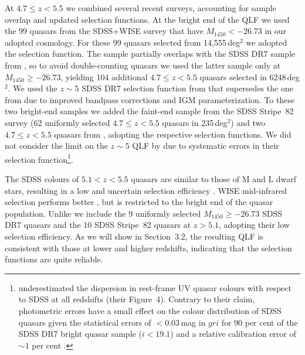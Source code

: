 \documentclass[fleqn,usenatbib]{mnras}
\begin{document}
At $4.7\le z<5.5$ we combined several recent surveys, accounting for
sample overlap and updated selection functions. At the bright end of
the QLF we used the 99 quasars from the SDSS+WISE survey
\citep{2016ApJ...829...33Y} that have $M_{1450}<-26.73$ in our adopted
cosmology.  For these 99 quasars selected from 14,555\,deg$^2$ we
adopted the \citet{2016ApJ...829...33Y} selection function.  The
\citet{2016ApJ...829...33Y} sample partially overlaps with the SDSS
DR7 sample from \citet{2013ApJ...768..105M}, so to avoid
double-counting quasars we used the latter sample only at $M_{1450}\ge
-26.73$, yielding 104 additional $4.7\le z<5.5$ quasars selected in
6248\,deg$^2$. We used the $z\sim 5$ SDSS DR7 selection function from
\citet{2013ApJ...768..105M} that supersedes the one from
\citet{2006AJ....131.2766R} due to improved bandpass corrections and IGM
parameterization.  To these two bright-end samples we added the
faint-end sample from the \citet{2013ApJ...768..105M} SDSS Stripe~82
survey (62 uniformly selected $4.7\le z<5.5$ quasars in 235\,deg$^2$)
and two $4.7\le z<5.5$ quasars from \citet{2011ApJ...728L..26G},
adopting the respective selection functions.  We did not consider the
limit on the $z\sim 5$ QLF by \citet{2012ApJ...756..160I} due to
systematic errors in their selection
function\footnote{\citet{2012ApJ...756..160I} underestimated the
  dispersion in rest-frame UV quasar colours with respect to SDSS at
  all redshifts (their Figure~4). Contrary to their claim, photometric
  errors have a small effect on the colour distribution of SDSS
  quasars given the statistical errors of $<0.03$\,mag in $gri$ for 90
  per cent of the SDSS DR7 bright quasar sample ($i<19.1$) and a
  relative calibration error of $\sim 1$ per cent
  \citep{2008ApJ...674.1217P}.}.

The SDSS colours of $5.1<z<5.5$ quasars are similar to those of M and
L dwarf stars, resulting in a low and uncertain selection efficiency
\citep{2013ApJ...768..105M}. WISE mid-infrared selection performs
better \citep{2016ApJ...829...33Y}, but is restricted to the bright
end of the quasar population. Unlike \citet{2013ApJ...768..105M} we
include the 9 uniformly selected $M_{1450}\ge -26.73$ SDSS DR7 quasars
and the 10 SDSS Stripe~82 quasars at $z>5.1$, adopting their low
selection efficiency.  As we will show in Section~3.2, the resulting
QLF is consistent with those at lower and higher redshifts, indicating
that the \citet{2013ApJ...768..105M} selection functions are quite
reliable.
\end{document}
